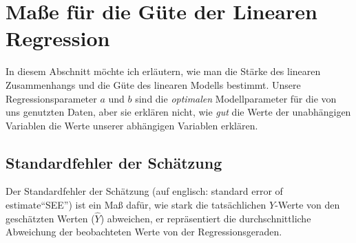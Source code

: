 \documentclass[ngerman, 12pt,parskip=half]{scrartcl}
\begin{document}
\begin{center}
\vspace*{1em}
\label{fig:final}\vspace*{1em}
\end{center}

\section{Maße für die Güte der Linearen Regression}

In diesem Abschnitt möchte ich erläutern, wie man die Stärke des linearen Zusammenhangs und die Güte des linearen Modells bestimmt. Unsere Regressionsparameter \(a\) und \(b\) sind die \textit{optimalen} Modellparameter für die von uns genutzten Daten, aber sie erklären nicht, wie \textit{gut} die Werte der unabhängigen Variablen die Werte unserer abhängigen Variablen erklären.

\subsection{Standardfehler der Schätzung}

Der Standardfehler der Schätzung (auf englisch: standard error of estimate\enquote{SEE}) ist ein Maß dafür, wie stark die tatsächlichen \(Y\)-Werte von den geschätzten Werten (\(\hat{Y}\)) abweichen, er repräsentiert die durchschnittliche Abweichung der beobachteten Werte von der Regressionsgeraden. 
\end{document}
